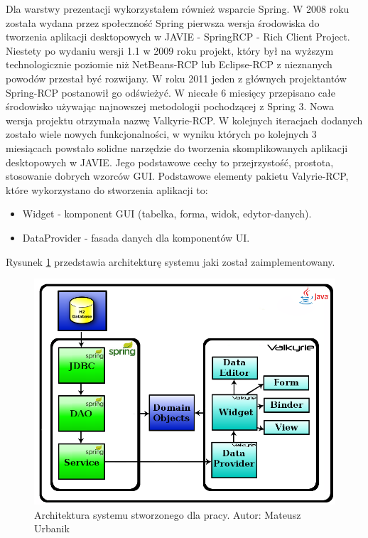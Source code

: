 Dla warstwy prezentacji wykorzystałem również wsparcie Spring. W 2008 roku została wydana przez społeczność Spring pierwsza wersja środowiska do tworzenia aplikacji desktopowych w JAVIE - SpringRCP - Rich Client Project. Niestety po wydaniu wersji 1.1 w 2009 roku projekt, który był na wyższym technologicznie poziomie niż NetBeans-RCP lub Eclipse-RCP z nieznanych powodów przestał być rozwijany\cite{spring_rcp_reference}. W roku 2011 jeden z głównych projektantów Spring-RCP postanowił go odświeżyć. W niecałe 6 miesięcy przepisano całe środowisko używając najnowszej metodologii pochodzącej z Spring 3. Nowa wersja projektu otrzymała nazwę Valkyrie-RCP\cite{valkyrie_reference}. W kolejnych iteracjach dodanych zostało wiele nowych funkcjonalności, w wyniku których po kolejnych 3 miesiącach powstało solidne narzędzie do tworzenia skomplikowanych aplikacji desktopowych w JAVIE. Jego podstawowe cechy to przejrzystość, prostota, stosowanie dobrych wzorców GUI.
Podstawowe elementy pakietu Valyrie-RCP, które wykorzystano do stworzenia aplikacji to\cite{valkyrie_reference}:
\begin{itemize}
 \item Widget - komponent GUI (tabelka, forma, widok, edytor-danych).
 \item DataProvider - fasada danych dla komponentów UI.
\end{itemize}

Rysunek \ref{img:rysunek_spring2} przedstawia architekturę systemu jaki został zaimplementowany.

\begin{figure}[!ht]
\centering
\includegraphics[scale=0.4]{images/spring-layers2}
\caption[Rysunek przedstawiający model architektury systemu]{Architektura systemu stworzonego dla pracy. Autor: Mateusz Urbanik}
\label{img:rysunek_spring2}
\end{figure}

